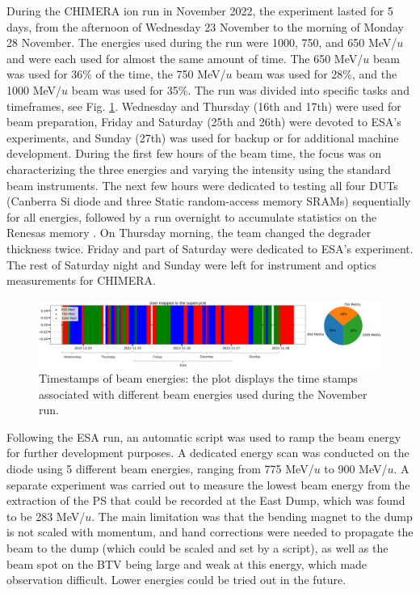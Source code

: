 \documentclass{cernatsnote}
\begin{document}
During the CHIMERA ion run in November 2022, the experiment lasted for 5 days, from the afternoon of Wednesday 23 November to the  morning of Monday 28 November. The energies used during the run were 1000, 750, and 650 MeV/$u$ and were each used for almost the same amount of time. The 650 MeV/$u$ beam was used for 36\% of the time, the 750 MeV/$u$ beam was used for 28\%, and the 1000 MeV/$u$ beam was used for 35\%. The run was divided into specific tasks and timeframes, see Fig. \ref{fig:timestamp_energies}. Wednesday and Thursday (16th and 17th) were used for beam preparation, Friday and Saturday (25th and 26th) were devoted to ESA's experiments, and Sunday (27th) was used for backup or for additional machine development. During the first few hours of the beam time, the focus was on characterizing the three energies and varying the intensity using the standard beam instruments. The next few hours were dedicated to testing all four DUTs (Canberra Si diode and three Static random-access memory SRAMs) sequentially for all energies, followed by a run overnight to accumulate statistics on the Renesas memory \cite{noauthor_rmlv0816bgsa_nodate}. On Thursday morning, the team changed the degrader thickness twice. Friday and part of Saturday were dedicated to ESA's experiment. The rest of Saturday night and Sunday were left for instrument and optics measurements for CHIMERA.

\begin{figure}[!htb]
\centering
\includegraphics[width=1.0\textwidth]{images/PS_BEAM_ENERGY/user_mapping_timestamp.png}
\caption{Timestamps of beam energies: the plot displays the time stamps associated with different beam energies used during the November run.}
\label{fig:timestamp_energies}
\end{figure}

Following the ESA run, an automatic script was used to ramp the beam energy for further development purposes. A dedicated energy scan was conducted on the diode using 5 different beam energies, ranging from 775 MeV/$u$ to 900 MeV/$u$. A separate experiment was carried out to measure the lowest beam energy from the extraction of the PS that could be recorded at the East Dump, which was found to be 283 MeV/$u$. The main limitation was that the bending magnet to the dump is not scaled with momentum, and hand corrections were needed to propagate the beam to the dump (which could be scaled and set by a script), as well as the beam spot on the BTV being large and weak at this energy, which made observation difficult. Lower energies could be tried out in the future.
\end{document}
